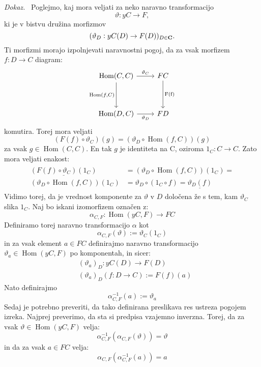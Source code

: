 \documentclass[12pt,a4paper]{book}
\theoremstyle{definition}
\theoremstyle{plain}
\newenvironment{dokaz}{\emph{Dokaz.}\ }{\hspace{\fill}{$\Box$}}
\theoremstyle{definition}
\theoremstyle{remark}
\DeclareMathOperator{\Hom}{Hom}
\begin{document}
\begin{dokaz}
Poglejmo, kaj mora veljati za neko naravno transformacijo
$$\vartheta : yC \to F,$$
ki je v bistvu družina morfizmov 
$$(\vartheta_D : yC(D) \to F(D))_{D \in \bf{C}}.$$
Ti morfizmi morajo izpolnjevati naravnostni pogoj, da za vsak morfizem $f : D \to C$ diagram:
%
\[ \begin{tikzcd}[row sep=huge]
\Hom(C,C) \arrow[r, "\vartheta_C"] \arrow[d, "{\Hom(f,C)}"'] & FC \arrow[d, "\text{F(f)}"] \\
\Hom(D,C) \arrow[r, "\vartheta_D"'] & FD
\end{tikzcd} \]
komutira. Torej mora veljati 
$$(F(f) \circ \vartheta_C) (g) = (\vartheta_D \circ \Hom(f,C)) (g)$$
za vsak $g \in \Hom(C,C)$. En tak $g$ je identiteta na C, oziroma $1_C : C \to C$. Zato mora veljati enakost:
%
\begin{align} \label{eq1}
\begin{split}
\underline{(F(f) \circ \vartheta_C)(1_C)}& = (\vartheta_D \circ \Hom(f,C))(1_C) = \\
(\vartheta_D \circ \Hom(f,C))(1_C)&  =
\vartheta_D \circ ( 1_C \circ f) = \underline{\vartheta_D(f)}
\end{split}
\end{align}
Vidimo torej, da je vrednost komponente za $\vartheta$ v $D$ določena že s tem, kam $\vartheta_C$ slika $1_C$.
Naj bo iskani izomorfizem označen z: 
$$\alpha_{C,F} : \Hom(yC,F) \to FC$$ 
Definiramo torej naravno transformacijo $\alpha$ kot
\begin{equation}
\boxed{\alpha_{C,F}(\vartheta) := \vartheta_C(1_C)}
\end{equation}
%
in za vsak element $a \in FC$ definirajmo naravno transformacijo $\vartheta_a \in \Hom(yC,F)$ po komponentah, in sicer:
\begin{align}
&(\vartheta_a)_D : yC(D) \to F(D) \\
&(\vartheta_a)_D(f : D \to C) := F(f)(a)
\end{align}
%
Nato definirajmo
\begin{equation}
\boxed{\alpha^{-1}_{C,F}(a) := \vartheta_a}
\end{equation}
%
Sedaj je potrebno preveriti, da tako definirana preslikava res ustreza pogojem izreka.
Najprej preverimo, da sta si predpisa vzajemno inverzna.
Torej, da za vsak $\vartheta \in \Hom(yC,F)$ velja: 
$$ \alpha^{-1}_{C,F}(\alpha_{C,F}(\vartheta)) = \vartheta$$
%
in da za vsak $a \in FC$ velja:
$$ \alpha_{C,F}(\alpha^{-1}_{C,F}(a)) = a$$
%
\begin{itemize}

\end{itemize}
\end{dokaz}
\end{document}
